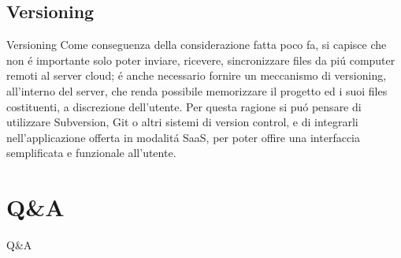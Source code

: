 \documentclass{beamer}
\begin{document}
\subsection{Versioning}
\begin{frame}{Versioning}
Come conseguenza della considerazione fatta poco fa, si capisce che non \'e importante solo poter inviare, ricevere, sincronizzare
files da pi\'u computer remoti al server cloud; \'e anche necessario fornire un meccanismo di versioning, all'interno del server,
che renda possibile memorizzare il progetto ed i suoi files costituenti, a discrezione dell'utente.
\newline
Per questa ragione si pu\'o pensare di utilizzare Subversion, Git o altri sistemi di version control, e di integrarli nell'applicazione offerta in modalit\'a SaaS, per poter offire una interfaccia semplificata e funzionale all'utente.
\end{frame}

\section{Q\&A}
\begin{frame}{Q\&A}
\end{frame}
\end{document}
